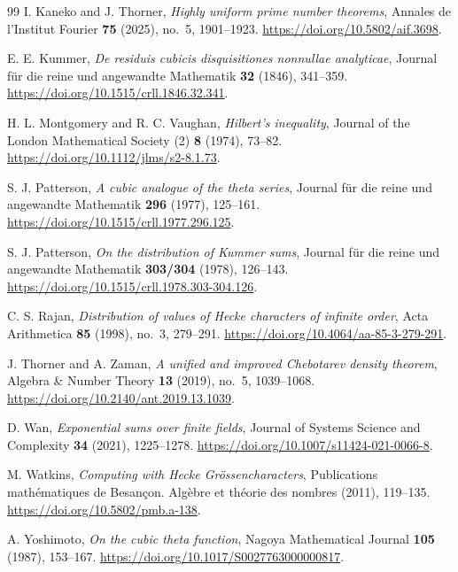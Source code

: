 \documentclass[11pt]{article}
\theoremstyle{definition}
\theoremstyle{remark}
\numberwithin{equation}{section}
\begin{document}
\begin{thebibliography}{99}
I. Kaneko and J. Thorner,
\emph{Highly uniform prime number theorems},
Annales de l'Institut Fourier \textbf{75} (2025), no.~5, 1901--1923.
\url{https://doi.org/10.5802/aif.3698}.

E. E. Kummer,
\emph{De residuis cubicis disquisitiones nonnullae analyticae},
Journal f\"ur die reine und angewandte Mathematik
\textbf{32} (1846), 341--359.
\url{https://doi.org/10.1515/crll.1846.32.341}.

H. L. Montgomery and R. C. Vaughan,
\emph{Hilbert's inequality},
Journal of the London Mathematical Society (2) \textbf{8} (1974),
73--82.
\url{https://doi.org/10.1112/jlms/s2-8.1.73}.

S. J. Patterson,
\emph{A cubic analogue of the theta series},
Journal f\"ur die reine und angewandte Mathematik
\textbf{296} (1977), 125--161.
\url{https://doi.org/10.1515/crll.1977.296.125}.

S. J. Patterson,
\emph{On the distribution of Kummer sums},
Journal f\"ur die reine und angewandte Mathematik
\textbf{303/304} (1978), 126--143.
\url{https://doi.org/10.1515/crll.1978.303-304.126}.

C. S. Rajan,
\emph{Distribution of values of Hecke characters of infinite order},
Acta Arithmetica \textbf{85} (1998), no.~3, 279--291.
\url{https://doi.org/10.4064/aa-85-3-279-291}.

J. Thorner and A. Zaman,
\emph{A unified and improved Chebotarev density theorem},
Algebra \& Number Theory \textbf{13} (2019), no.~5, 1039--1068.
\url{https://doi.org/10.2140/ant.2019.13.1039}.

D. Wan,
\emph{Exponential sums over finite fields},
Journal of Systems Science and Complexity \textbf{34} (2021),
1225--1278.
\url{https://doi.org/10.1007/s11424-021-0066-8}.

M. Watkins,
\emph{Computing with Hecke Gr\"ossencharacters},
Publications math\'ematiques de Besan\c{c}on.
Alg\`ebre et th\'eorie des nombres (2011), 119--135.
\url{https://doi.org/10.5802/pmb.a-138}.

A. Yoshimoto,
\emph{On the cubic theta function},
Nagoya Mathematical Journal \textbf{105} (1987), 153--167.
\url{https://doi.org/10.1017/S0027763000000817}.

\end{thebibliography}
\endgroup
\end{document}
